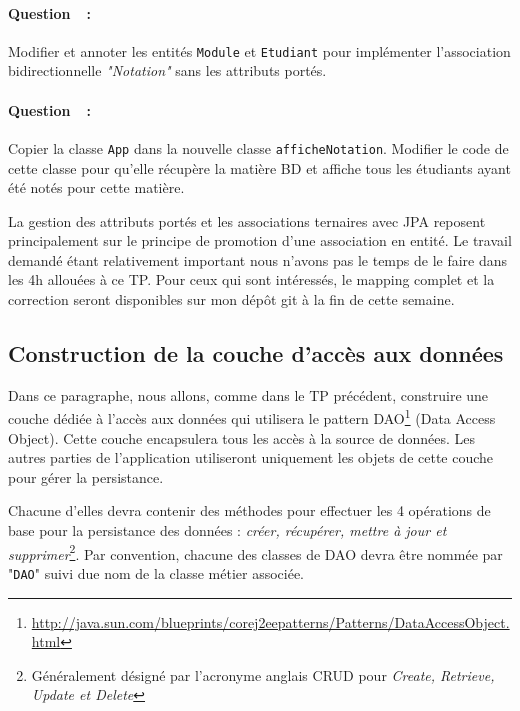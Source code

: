 \documentclass[a4paper,11pt]{article}
\newcounter{compteurQuestion}
\newcommand{\Question}{\paragraph*{Question~\thecompteurQuestion~:}\addtocounter{compteurQuestion}{1}}
\begin{document}
\Question Modifier et annoter les entités \texttt{Module} et \texttt{Etudiant} pour implémenter l'association 
bidirectionnelle \textit{"Notation"} sans les attributs portés.
\Question Copier la classe \texttt{App} dans la nouvelle classe \texttt{afficheNotation}. Modifier le code de cette classe 
pour qu'elle récupère la matière BD et affiche tous les étudiants ayant été notés pour cette matière.

La gestion des attributs portés et les associations ternaires avec JPA reposent principalement sur le principe de 
promotion d'une association en entité. Le travail demandé étant relativement important nous n'avons pas le temps de le 
faire dans les 4h allouées à ce TP. Pour ceux qui sont intéressés, le mapping complet et la correction seront disponibles 
sur mon dépôt git à la fin de cette semaine.  

\subsection{Construction de la couche d'accès aux données}
Dans ce paragraphe, nous allons, comme dans le TP précédent, construire une couche dédiée à l'accès aux données 
qui utilisera le pattern DAO\footnote{\url{http://java.sun.com/blueprints/corej2eepatterns/Patterns/DataAccessObject.html}} (Data Access Object).
Cette couche encapsulera tous les accès à la source de données. Les autres parties de l'application 
utiliseront uniquement les objets de cette couche pour gérer la persistance. 

Chacune d'elles devra contenir des méthodes pour effectuer les 4 opérations de base pour la persistance des données : 
\textit{créer, récupérer, mettre à jour et supprimer}\footnote{Généralement désigné par l'acronyme anglais CRUD pour 
\textit{Create, Retrieve, Update et Delete}}. Par convention, chacune des classes de DAO devra être 
nommée par "\texttt{DAO}" suivi due nom de la classe métier associée. 
\end{document}
